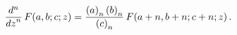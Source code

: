 \[\frac{{d}^{n}}{{dz}^{n}}\mathop{F\/}\nolimits\!\left(a,b;c;z\right)=\frac{%
\left(a\right)_{n}\left(b\right)_{n}}{\left(c\right)_{n}}\*\mathop{F\/}%
\nolimits\!\left(a+n,b+n;c+n;z\right).\]